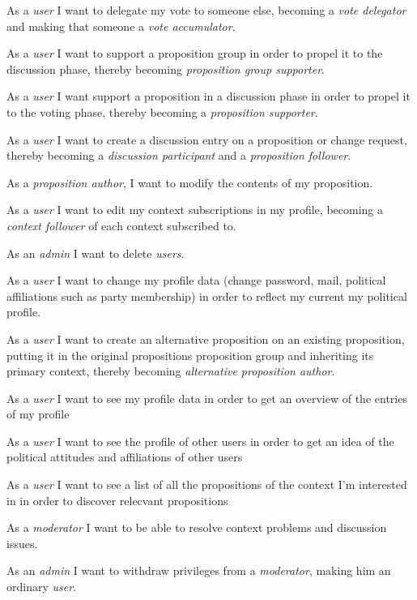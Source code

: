 As a \textit{user} I want to delegate my vote to someone else, becoming a \textit{vote delegator} and making that someone a \textit{vote accumulator}.

As a \textit{user} I want to support a proposition group in order to propel it to the discussion phase, thereby becoming \textit{proposition group supporter}.

 As a \textit{user} I want support a proposition in a discussion phase in order to propel it to the voting phase, thereby becoming a \textit{proposition supporter}.

 As a \textit{user} I want to create a discussion entry on a proposition or change request, thereby becoming a \textit{discussion participant} and a \textit{proposition follower}.

 As a \textit{proposition author}, I want to modify the contents of my proposition.

 As a \textit{user} I want to edit my context subscriptions in my profile, becoming a \textit{context follower} of each context subscribed to.

 As an \textit{admin} I want to delete \textit{users}.

 As a \textit{user} I want to change my profile data (change password, mail, political affiliations such as party membership) in order to reflect my current my political profile.
 
 As a \textit{user} I want to create an alternative proposition on an existing proposition, putting it in the original propositions proposition group and inheriting its primary context, thereby becoming \textit{alternative proposition author}.

 As a \textit{user} I want to see my profile data in order to get an overview of the entries of my profile

 As a \textit{user} I want to see the profile of other users in order to get an idea of the political attitudes and affiliations of other users

 As a \textit{user} I want to see a list of all the propositions of the context I’m interested in in order to discover relecvant propositions

 As a \textit{moderator} I want to be able to resolve context problems and discussion issues.

 As an \textit{admin} I want to withdraw privileges from a \textit{moderator}, making him an ordinary \textit{user}.

